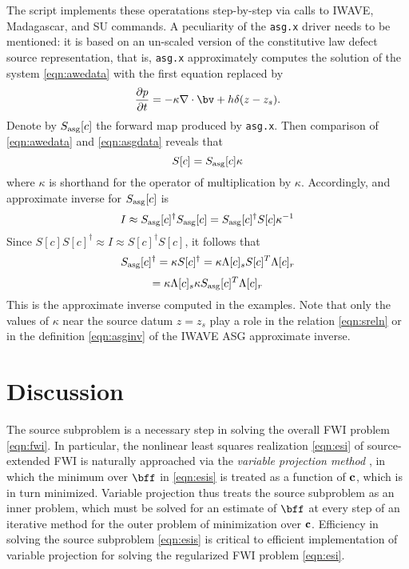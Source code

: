 The script implements these operatations step-by-step via calls to IWAVE, Madagascar, and SU commands. A peculiarity of the {\tt asg.x} driver needs to be mentioned: it is based on an un-scaled version of the constitutive law defect source representation, that is, {\tt asg.x} approximately computes the solution of the system \ref{eqn:awedata} with the first equation replaced by
\begin{equation}
\label{eqn:asgdata}
\frac{\partial p}{\partial t}  =  - \kappa \nabla \cdot \bv +
h \delta(z-z_s).
\end{equation}
Denote by $S_{\rm asg}[c]$ the forward map produced by {\tt asg.x}. Then comparison of \ref{eqn:awedata} and \ref{eqn:asgdata} reveals that
\begin{equation}
\label{eqn:sreln}
S[c]=S_{\rm asg}[c]\kappa
\end{equation}
where $\kappa$ is shorthand for the operator of multiplication by $\kappa$. Accordingly, and approximate inverse for $S_{\rm asg}[c]$ is
\[
I \approx S_{\rm asg}[c]^{\dagger}S_{\rm asg}[c] = S_{\rm asg}[c]^{\dagger}S[c]\kappa^{-1}
\]
Since $S[c]S[c]^{\dagger} \approx I \approx S[c]^{\dagger}S[c]$, it follows that
\[
S_{\rm asg}[c]^{\dagger}=\kappa S[c]^{\dagger} = \kappa\Lambda[c]_s S[c]^T \Lambda[c]_r 
\]
\begin{equation}
\label{eqn:asginv}
= \kappa \Lambda[c]_s \kappa S_{\rm asg}[c]^T\Lambda[c]_r
\end{equation}
This is the approximate inverse computed in the examples. Note that
only the values of $\kappa$ near the source datum $z=z_s$ play a role
in the relation \ref{eqn:sreln} or in the definition \ref{eqn:asginv}
of the IWAVE ASG approximate inverse.

\section{Discussion}

The source subproblem is a necessary step in solving the overall FWI problem \ref{eqn:fwi}. In particular, the nonlinear least squares realization \ref{eqn:esi} of source-extended FWI is naturally approached via the {\em variable projection method} \cite[]{GolubPereyra:73,GolubPereyra:03,vanLeeuwenMulder:09,Rickett:SEG12}, in which the minimum over $\bff$ in \ref{eqn:esis} is treated as a function of $\bf{c}$, which is in turn minimized. Variable projection thus treats the source subproblem as an inner problem, which must be solved for an estimate of $\bff$ at every step of an iterative method for the outer problem of minimization over $\bf{c}$. Efficiency in solving the source subproblem \ref{eqn:esis} is critical to efficient implementation of variable projection for solving the regularized FWI problem \ref{eqn:esi}.

